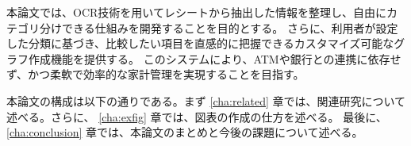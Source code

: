 \documentclass[main]{subfiles}
\begin{document}
本論文では、OCR技術を用いてレシートから抽出した情報を整理し、自由にカテゴリ分けできる仕組みを開発することを目的とする。
さらに、利用者が設定した分類に基づき、比較したい項目を直感的に把握できるカスタマイズ可能なグラフ作成機能を提供する。
このシステムにより、ATMや銀行との連携に依存せず、かつ柔軟で効率的な家計管理を実現することを目指す。

本論文の構成は以下の通りである。まず \ref{cha:related} 章では、関連研究について述べる。さらに、
\ref{cha:exfig} 章では、図表の作成の仕方を述べる。
最後に、\ref{cha:conclusion} 章では、本論文のまとめと今後の課題について述べる。
\end{document}
